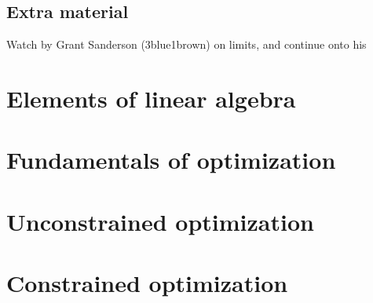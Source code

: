 \documentclass[letterpaper,10pt,english]{jupyterBook}
\begin{document}
\section{Extra material}
\label{\detokenize{04.basic_analysis:extra-material}}
\sphinxAtStartPar
Watch  by Grant Sanderson (3blue1brown) on limits, and continue onto his 

\sphinxstepscope


\chapter{Elements of linear algebra}
\label{\detokenize{05.linear_algebra:elements-of-linear-algebra}}\label{\detokenize{05.linear_algebra::doc}}



\sphinxstepscope


\chapter{Fundamentals of optimization}
\label{\detokenize{06.optimization_fundamentals:fundamentals-of-optimization}}\label{\detokenize{06.optimization_fundamentals::doc}}

\sphinxstepscope


\chapter{Unconstrained optimization}
\label{\detokenize{07.unconstrained:unconstrained-optimization}}\label{\detokenize{07.unconstrained::doc}}

\sphinxstepscope


\chapter{Constrained optimization}
\label{\detokenize{08.constrained:constrained-optimization}}\label{\detokenize{08.constrained::doc}}
\end{document}
